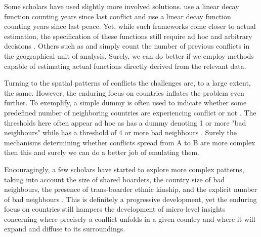 \documentclass[a4paper]{article}
\begin{document}
Some scholars have used slightly more involved solutions. \cite{Collier_Hoeffler_2004} use a linear decay function counting years since last conflict and \cite{Hegre_Sambanis_2006} use a linear decay function counting years since last peace. Yet, while such frameworks come closer to actual estimation, the specification of these functions still require ad hoc and arbitrary decisions \cite[501]{Gelman_2013}. Others such as \cite{Cederman_Gleditsch_Buhaug_2013} and \cite{Maase} simply count the number of previous conflicts in the geographical unit of analysis. Surely, we can do better if we employ methods capable of estimating actual functions directly derived from the relevant data.\par

Turning to the spatial patterns of conflicts the challenges are, to a large extent, the same. However, the enduring focus on countries inflates the problem even further. To exemplify, a simple dummy is often used to indicate whether some predefined number of neighboring countries are experiencing conflict or not \citep{Hegre_Sambanis_2006, Goldstone_2010}. The thresholds here often appear ad hoc as \cite{Hegre_Sambanis_2006} has a dummy denoting 1 or more "bad neighbours" \citep[521-522]{Hegre_Sambanis_2006} while \cite{Goldstone_2010} has a threshold of 4 or more bad neighbours \citep[197]{Goldstone_2010}. Surely the mechanisms determining whether conflicts spread from A to B are more complex then this and surely we can do a better job of emulating them.\par 

Encouragingly, a few scholars have started to explore more complex patterns, taking into account the size of shared boarders, the country size of bad neighbours, the presence of trans-boarder ethnic kinship, and the explicit number of bad neighbours \citep{buhaug2008contagion, Cederman_Gleditsch_Buhaug_2013, bara_2017}. This is definitely a progressive development, yet the enduring focus on countries still hampers the development of micro-level insights concerning where precisely a conflict unfolds in a given country and where it will expand and diffuse to its surroundings.\par
\end{document}
